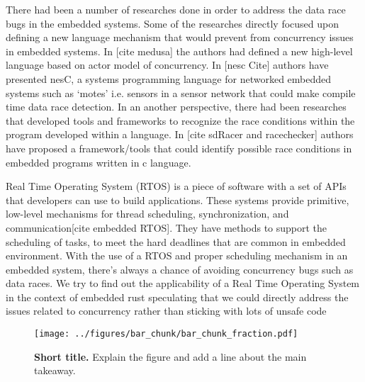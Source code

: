 There had been a number of researches done in order to address the data race bugs in the embedded systems. Some of the researches directly focused upon defining a new language mechanism that would prevent from concurrency issues in embedded systems. In [cite medusa] the authors had defined a new high-level language based on actor model of concurrency. In [nesc Cite] authors have presented nesC, a systems programming language for networked embedded systems such as ‘motes’ i.e. sensors in a sensor network that could make compile time data race detection. In an another perspective, there had been researches that developed tools and frameworks to recognize the race conditions within the program developed within a language. In [cite sdRacer and racechecker] authors have proposed a framework/tools that could identify possible race conditions in embedded programs written in c language. 
 
Real Time Operating System (RTOS) is a piece of software with a set of APIs that developers can use to build applications. These systems provide primitive, low-level mechanisms for thread scheduling, synchronization, and communication[cite embedded RTOS].  They have methods to support the scheduling of tasks, to meet the hard deadlines that are common in embedded environment. With the use of a RTOS and proper scheduling mechanism in an embedded system, there’s always a chance of avoiding concurrency bugs such as data races. We try to find out the applicability of a Real Time Operating System in the context of embedded rust speculating that we could directly address the issues related to concurrency rather than sticking with lots of unsafe code  




\Blindtext[3]

\begin{figure}[t]
\centering
\texttt{[image: ../figures/bar\_chunk/bar\_chunk\_fraction.pdf]}
\caption{\textbf{Short title.} Explain the figure and add a line about the main takeaway.}
\label{fig:bar}
\end{figure} 



